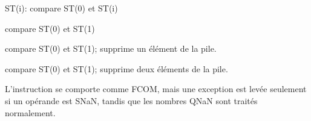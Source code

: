   \item[FUCOM] ST(i): compare ST(0) et ST(i)
  \item[FUCOM] compare ST(0) et ST(1)
  \item[FUCOMP] compare ST(0) et ST(1); supprime un élément de la pile.
  \item[FUCOMPP] compare ST(0) et ST(1); supprime deux éléments de la pile.

  L'instruction se comporte comme FCOM, mais une exception est levée seulement si
  un opérande est SNaN, tandis que les nombres QNaN sont traités normalement.
